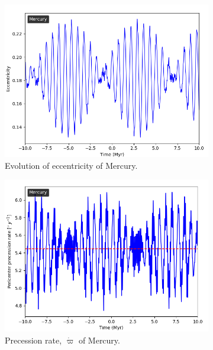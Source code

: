 \documentclass[11pt, oneside]{article}   	%
\begin{document}
\begin{figure}[!h]
    \centering
    \begin{subfigure}[t]{0.49\textwidth}
    \captionsetup{width=0.9\textwidth}
	\centering
       	 \includegraphics[width=\textwidth]{Merc_ecc.png}
       	 \caption{Evolution of eccentricity of Mercury.}
        	\label{}
    \end{subfigure}
    \begin{subfigure}[t]{0.49\textwidth}
    \captionsetup{width=0.9\textwidth}
        	\centering
	\includegraphics[width=\textwidth]{Merc_pidot.png}
        	\caption{Precession rate, $\dot{\varpi}$ of Mercury.}
        	\label{fig:pidot}
    \end{subfigure}
    \caption{}
    \label{Merc1}
\end{figure}
\end{document}

